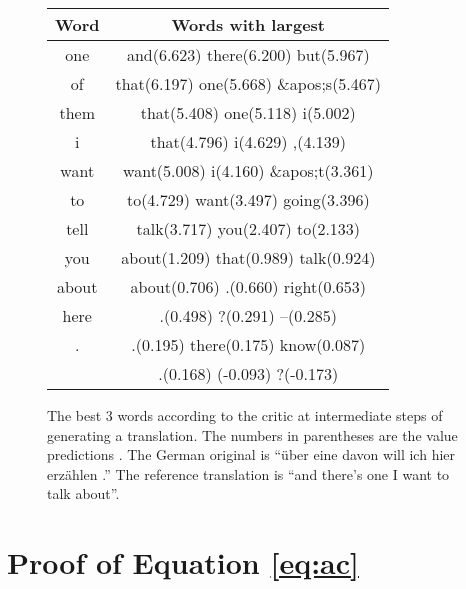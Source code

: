 \documentclass{article} \usepackage{iclr2017_conference,times}
\begin{document}
\begin{figure}[h]\centering
\label{tab:qvalues}
\caption{The best 3 words according to the critic at intermediate
        steps of generating a translation. The numbers in parentheses
        are the value predictions . The German original is 
        ``\"{u}ber eine davon will ich hier erz\"{a}hlen .''
        The reference translation is 
        ``and there's one I want to talk about''.}

\begin{tabular}{c|c}
    \textrm{Word} & \textrm{Words with largest } \\
    \hline
one &
    and(6.623) there(6.200) but(5.967) \\
    of &
    that(6.197) one(5.668) \&apos;s(5.467) \\
    them &
    that(5.408) one(5.118) i(5.002) \\
    i &
    that(4.796) i(4.629) ,(4.139) \\
    want &
    want(5.008) i(4.160) \&apos;t(3.361) \\
    to &
    to(4.729) want(3.497) going(3.396) \\
    tell &
    talk(3.717) you(2.407) to(2.133) \\
    you &
    about(1.209) that(0.989) talk(0.924) \\
    about &
    about(0.706) .(0.660) right(0.653) \\
    here &
    .(0.498) ?(0.291) --(0.285) \\
    . &
    .(0.195) there(0.175) know(0.087) \\
       &
    .(0.168)   (-0.093) ?(-0.173) \\
\end{tabular}
\end{figure}

\newpage

\section{Proof of Equation \eqref{eq:ac}}

    

 
\end{document}
